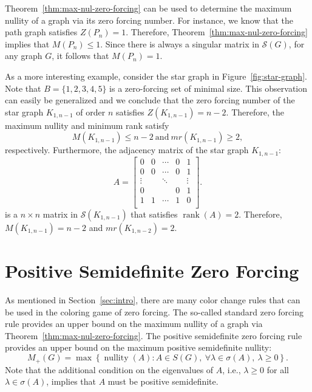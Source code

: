 \documentclass{article}
\theoremstyle{definition}
\newcommand\nullity[1]{\operatorname{nullity}\left(#1\right)}
\newcommand\rank[1]{\operatorname{rank}\left(#1\right)}
\begin{document}
Theorem~\ref{thm:max-nul-zero-forcing} can be used to determine the maximum nullity of a graph via its zero forcing number. 
For instance, we know that the path graph satisfies $Z(P_{n})=1$.
Therefore, Theorem~\ref{thm:max-nul-zero-forcing} implies that $M(P_{n}) \leq 1$.
Since there is always a singular matrix in $\mathcal{S}(G)$, for any graph $G$, it follows that $M(P_{n})=1$.

As a more interesting example, consider the star graph in Figure~\ref{fig:star-graph}.
Note that $B=\{1,2,3,4,5\}$ is a zero-forcing set of minimal size. 
This observation can easily be generalized and we conclude that the zero forcing number of the star graph $K_{1,n-1}$ of order $n$ satisfies $Z(K_{1,n-1}) = n-2$.
Therefore, the maximum nullity and minimum rank satisfy
\[
M(K_{1,n-1}) \leq n-2~\text{and}~mr(K_{1,n-1}) \geq 2,
\]
respectively.
Furthermore, the adjacency matrix of the star graph $K_{1,n-1}$:
\[
A = \begin{bmatrix} 
		0 & 0 & \cdots & 0 & 1 \\
		0 & 0 & \cdots & 0 & 1 \\
		\vdots & & \ddots & &  \vdots \\
		0 & & & 0 & 1 \\
		1 & 1 & \cdots & 1 & 0 \\
	\end{bmatrix}.
\]
is a $n\times n$ matrix in $\mathcal{S}(K_{1,n-1})$ that satisfies $\rank{A} = 2$.
Therefore, $M(K_{1,n-1})=n-2$ and $mr(K_{1,n-2}) = 2$.

\section{Positive Semidefinite Zero Forcing}\label{sec:psd-zf}
As mentioned in Section~\ref{sec:intro}, there are many color change rules that can be used in the coloring game of zero forcing. 
The so-called standard zero forcing rule provides an upper bound on the maximum nullity of a graph via Theorem~\ref{thm:max-nul-zero-forcing}.
The positive semidefinite zero forcing rule provides an upper bound on the maximum positive semidefinite nullity:
\[
M_{+}(G) = \max\left\{\nullity{A}\colon A\in S(G),~\forall\lambda\in\sigma(A),~\lambda\geq 0\right\}.
\]
Note that the additional condition on the eigenvalues of $A$, i.e., $\lambda\geq 0$ for all $\lambda\in\sigma(A)$, implies that $A$ must be positive semidefinite. 
\end{document}
